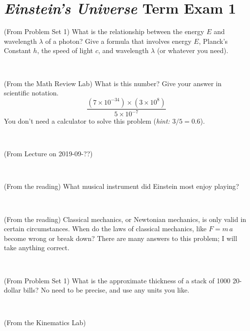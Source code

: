 \documentclass[12pt, letterpaper]{article}
\begin{document}
\section*{\textsl{Einstein's Universe} Term Exam 1}
\setcounter{problem}{1}


\begin{problem} (From Problem Set 1)
What is the relationship between the energy $E$ and wavelength
$\lambda$ of a photon? Give a formula that involves energy $E$,
Planck's Constant $h$, the speed of light $c$, and wavelength
$\lambda$ (or whatever you need).
\end{problem}

\vfill ~

\begin{problem} (From the Math Review Lab)
What is this number? Give your answer in scientific notation.
$$
\frac{(7\times10^{-34})\times(3\times10^8)}{5\times10^{-7}}
$$
You don't need a calculator to solve this problem (\textit{hint: $3/5=0.6$}).
\end{problem}


\vfill ~

\begin{problem} (From Lecture on 2019-09-??)
\end{problem}


\vfill ~

\begin{problem} (From the reading)
What musical instrument did Einstein most enjoy playing?
\end{problem}


\vfill ~


\clearpage


\begin{problem} (From the reading)
Classical mechanics, or Newtonian mechanics, is only valid in certain
circumstances. When do the laws of classical mechanics, like $F =
m\,a$ become wrong or break down? There are many answers to this
problem; I will take anything correct.
\end{problem}


\vfill ~

\begin{problem} (From Problem Set 1)
What is the approximate thickness of a stack of 1000 20-dollar bills?
No need to be precise, and use any units you like.
\end{problem}


\vfill ~

\begin{problem} (From the Kinematics Lab)

\end{problem}
\end{document}
